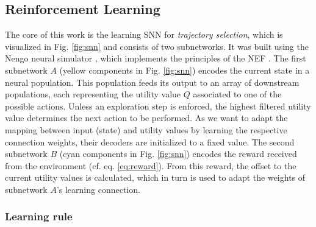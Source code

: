 \subsection{Reinforcement Learning}%
\label{subsec:reinforcement_learning_network}

The core of this work is the learning \acl{SNN} for \emph{trajectory selection}, which  is visualized in Fig. \ref{fig:snn} and consists of two subnetworks.
It was built using the Nengo neural simulator \cite{Bekolay2013}, which implements the principles of the \ac{NEF} \cite{Eliasmith2003}.
The first subnetwork $A$ (yellow components in Fig. \ref{fig:snn}) encodes the current state in a neural population.
This population feeds its output to an array of downstream populations, each representing the utility value $Q$ associated to one of the possible actions.
Unless an exploration step is enforced, the highest filtered utility value determines the next action to be performed.
As we want to adapt the mapping between input (state) and utility values by learning the respective connection weights, their decoders are initialized to a fixed value. 
The second subnetwork $B$ (cyan components in Fig. \ref{fig:snn}) encodes the reward received from the environment (cf. eq. \ref{eq:reward}).
From this reward, the offset to the current utility values is calculated, which in turn is used to adapt the weights of subnetwork $A$'s learning connection.

\subsubsection{Learning rule}%
\label{ssubsec:learning_rule}

